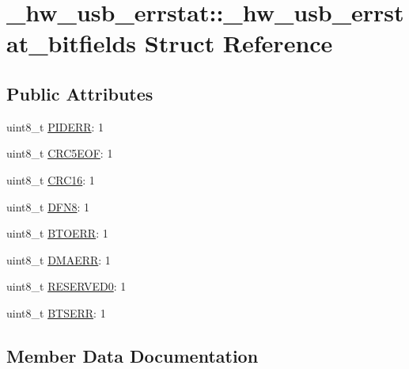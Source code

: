 \hypertarget{struct__hw__usb__errstat_1_1__hw__usb__errstat__bitfields}{}\section{\+\_\+hw\+\_\+usb\+\_\+errstat\+:\+:\+\_\+hw\+\_\+usb\+\_\+errstat\+\_\+bitfields Struct Reference}
\label{struct__hw__usb__errstat_1_1__hw__usb__errstat__bitfields}
\subsection*{Public Attributes}
\begin{DoxyCompactItemize}
\item 
uint8\+\_\+t \hyperlink{struct__hw__usb__errstat_1_1__hw__usb__errstat__bitfields_aeb3aaa7b0f24a663e620380605961df0}{P\+I\+D\+E\+RR}\+: 1
\item 
uint8\+\_\+t \hyperlink{struct__hw__usb__errstat_1_1__hw__usb__errstat__bitfields_a8dafcba37cc76183690494e1cfca061b}{C\+R\+C5\+E\+OF}\+: 1
\item 
uint8\+\_\+t \hyperlink{struct__hw__usb__errstat_1_1__hw__usb__errstat__bitfields_a8e9e53eb0603f33ee5712e6a5cf6efb6}{C\+R\+C16}\+: 1
\item 
uint8\+\_\+t \hyperlink{struct__hw__usb__errstat_1_1__hw__usb__errstat__bitfields_ad4e65f83c09f9c47475f64146b18d1b7}{D\+F\+N8}\+: 1
\item 
uint8\+\_\+t \hyperlink{struct__hw__usb__errstat_1_1__hw__usb__errstat__bitfields_a84eaa10b29be9e890471fa8a84faf969}{B\+T\+O\+E\+RR}\+: 1
\item 
uint8\+\_\+t \hyperlink{struct__hw__usb__errstat_1_1__hw__usb__errstat__bitfields_a427a51280c99c82e0a18897a6662391c}{D\+M\+A\+E\+RR}\+: 1
\item 
uint8\+\_\+t \hyperlink{struct__hw__usb__errstat_1_1__hw__usb__errstat__bitfields_a063707ff75c18b1c5932d558827be3c9}{R\+E\+S\+E\+R\+V\+E\+D0}\+: 1
\item 
uint8\+\_\+t \hyperlink{struct__hw__usb__errstat_1_1__hw__usb__errstat__bitfields_a73ae82fd7713d2bdee4f0277abf2866d}{B\+T\+S\+E\+RR}\+: 1
\end{DoxyCompactItemize}


\subsection{Member Data Documentation}
